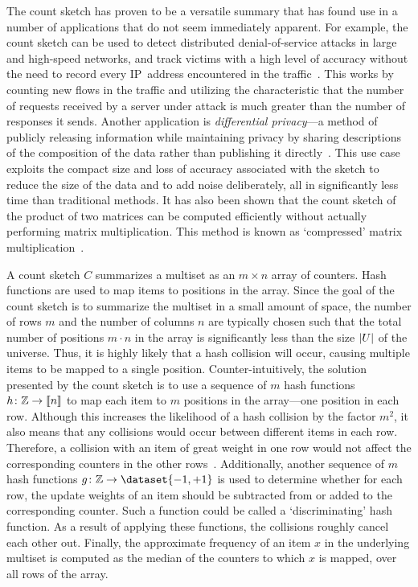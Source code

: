 The count sketch has proven to be a versatile summary that has found use in a number of applications that do not seem immediately apparent.
For example, the count sketch can be used to detect distributed denial-of-service attacks in large and high-speed networks, and track victims with a high level of accuracy without the need to record every IP~address encountered in the traffic~\citep{liu11}.
This works by counting new flows in the traffic and utilizing the characteristic that the number of requests received by a server under attack is much greater than the number of responses it sends.
Another application is \emph{differential privacy}---a method of publicly releasing information while maintaining privacy by sharing descriptions of the composition of the data rather than publishing it directly~\citep{cormode12}.
This use case exploits the compact size and loss of accuracy associated with the sketch to reduce the size of the data and to add noise deliberately, all in significantly less time than traditional methods.
It has also been shown that the count sketch of the product of two matrices can be computed efficiently without actually performing matrix multiplication.
This method is known as `compressed' matrix multiplication~\citep{pagh13}.

A count sketch \( C \) summarizes a multiset as an \( m \times n \) array of counters.
Hash functions are used to map items to positions in the array.
Since the goal of the count sketch is to summarize the multiset in a small amount of space, the number of rows \( m \) and the number of columns \( n \) are typically chosen such that the total number of positions \( m \cdot n \) in the array is significantly less than the size \( \lvert U\rvert \) of the universe.
Thus, it is highly likely that a hash collision will occur, causing multiple items to be mapped to a single position.
Counter-intuitively, the solution presented by the count sketch is to use a sequence of \( m \) hash functions \( h \colon \mathbb{Z} \to \llbracket n\rrbracket \) to map each item to \( m \) positions in the array---one position in each row.
Although this increases the likelihood of a hash collision by the factor \( m^{2} \), it also means that any collisions would occur between different items in each row.
Therefore, a collision with an item of great weight in one row would not affect the corresponding counters in the other rows~\citep{charikar02,cormode20}.
Additionally, another sequence of \( m \) hash functions \( g \colon \integers \to \dataset{-1, +1} \) is used to determine whether for each row, the update weights of an item should be subtracted from or added to the corresponding counter.
Such a function could be called a `discriminating' hash function.
As a result of applying these functions, the collisions roughly cancel each other out.
Finally, the approximate frequency of an item \( x \) in the underlying multiset is computed as the median of the counters to which \( x \) is mapped, over all rows of the array.

